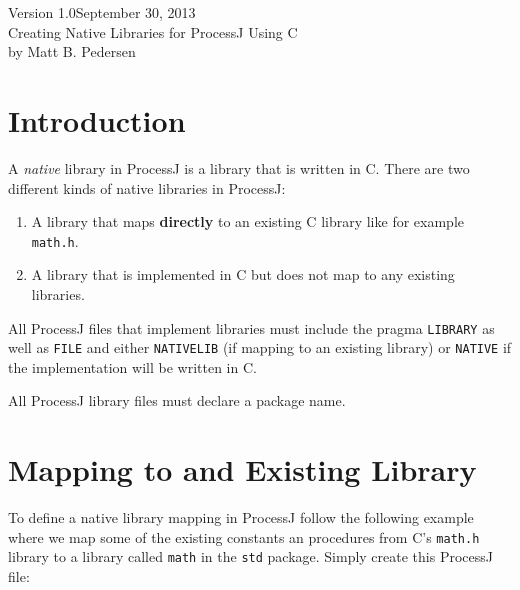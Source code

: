 \documentclass[pdflatex,11pt,letter]{article}
\begin{document}
\begin{center}
Version 1.0\hfill{}September 30, 2013\\[0.5cm]
{\Huge Creating Native Libraries for ProcessJ Using C}\\[0.5cm]
by Matt B. Pedersen
\end{center}

\section{Introduction}

A {\it native} library in ProcessJ is a library that is written in C. There are 
two different kinds of native libraries in ProcessJ:

\begin{enumerate}
\item A library that maps {\bf directly} to an existing C library like for example {\tt math.h}.
\item A library that is implemented in C but does not map to any existing libraries.
\end{enumerate}

\noindent
All ProcessJ files that implement libraries must include the pragma
{\tt LIBRARY} as well as {\tt FILE} and either {\tt NATIVELIB} (if
mapping to an existing library) or {\tt NATIVE} if the implementation
will be written in C.

\noindent
All ProcessJ library files must declare a package name.

\section{Mapping to and Existing Library}

To define a native library mapping in ProcessJ follow the following example where 
we map some of the existing constants an procedures from C's {\tt math.h} library to a 
library called {\tt math} in the {\tt std} package. Simply create this ProcessJ file:
\end{document}
